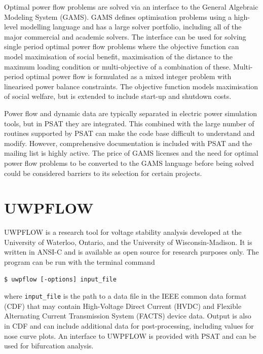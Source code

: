 Optimal power flow problems are solved via an interface to the General
Algebraic Modeling System (GAMS).  GAMS defines optimisation
problems using a high-level modelling language and has a large solver portfolio, including all
of the major commercial and academic solvers.  The interface can be used for
solving single period optimal power flow problems where the objective function
can model maximisation of social benefit, maximisation of the distance to
the maximum loading condition or multi-objective of a combination of these.
Multi-period optimal power flow is formulated as a mixed integer problem with
linearised power balance constraints.  The objective function models
maximisation of social welfare, but is extended to include start-up and
shutdown costs.

Power flow and dynamic data are typically separated in electric power
simulation tools, but in PSAT they are integrated.  This combined with the
large number of routines supported by PSAT can make the code base difficult to
understand and modify.  However, comprehensive documentation is included with
PSAT and the mailing list is highly active.
The price of GAMS
licenses and the need for optimal power flow problems to be converted to the
GAMS language before being solved could be considered barriers to its
selection for certain projects.

\section{UWPFLOW}
UWPFLOW is a research tool for voltage stability analysis developed at the
University of Waterloo, Ontario, and the University of Wisconsin-Madison.  It
is written in ANSI-C and is available as open source for research purposes
only. The program can be run with the terminal command
\begin{center}
\begin{verbatim}
$ uwpflow [-options] input_file
\end{verbatim}
\end{center}
where \texttt{input\_file} is the path to a data file in the IEEE common data
format (CDF) \cite{cdf:73} that may contain High-Voltage Direct Current (HVDC)
and Flexible Alternating Current Transmission System (FACTS) device data.
Output is also in CDF and can include additional data for post-processing,
including values for nose curve plots.  An interface to UWPFLOW is provided
with PSAT and can be used for bifurcation analysis.

